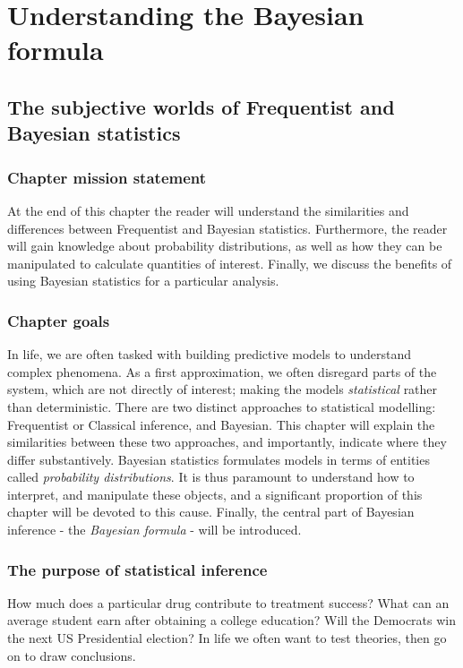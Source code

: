 \documentclass[11pt,fullpage]{book}
\begin{document}
\part{Understanding the Bayesian formula}

\chapter{The subjective worlds of Frequentist and Bayesian statistics}\label{chap:subjectiveFrequentistBayes}
\section{Chapter mission statement}
At the end of this chapter the reader will understand the similarities and differences between Frequentist and Bayesian statistics. Furthermore, the reader will gain knowledge about probability distributions, as well as how they can be manipulated to calculate quantities of interest. Finally, we discuss the benefits of using Bayesian statistics for a particular analysis.
 
\section{Chapter goals}
In life, we are often tasked with building predictive models to understand complex phenomena. As a first approximation, we often disregard parts of the system, which are not directly of interest; making the models \textit{statistical} rather than deterministic. There are two distinct approaches to statistical modelling: Frequentist or Classical inference, and Bayesian. This chapter will explain the similarities between these two approaches, and importantly, indicate where they differ substantively. Bayesian statistics formulates models in terms of entities called \textit{probability distributions}. It is thus paramount to understand how to interpret, and manipulate these objects, and a significant proportion of this chapter will be devoted to this cause. Finally, the central part of Bayesian inference - the \textit{Bayesian formula} - will be introduced.

\section{The purpose of statistical inference}
How much does a particular drug contribute to treatment success? What can an average student earn after obtaining a college education? Will the Democrats win the next US Presidential election? In life we often want to test theories, then go on to draw conclusions.
\end{document}
